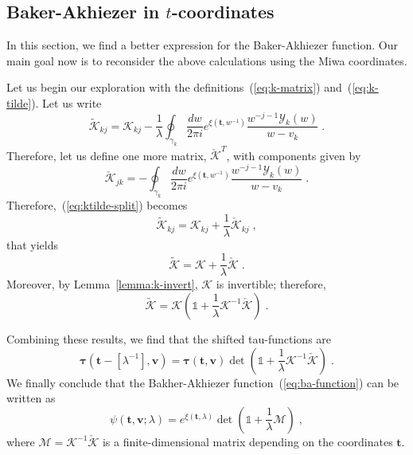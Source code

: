 \documentclass[a4paper,12pt]{amsart}
\begin{document}
\subsection{Baker-Akhiezer in \(t\)-coordinates}

In this section, we find a better expression for the Baker-Akhiezer
function. Our main goal now is to reconsider the above calculations
using the Miwa coordinates.

Let us begin our exploration with the definitions~(\ref{eq:k-matrix})
and~(\ref{eq:k-tilde}). Let us write
\begin{equation}
\label{eq:ktilde-split}
  \widetilde{\mathcal{K}}_{kj} = \mathcal{K}_{kj}
  - \frac{1}{\lambda} \oint_{\gamma_k} \frac{dw}{2\pi i}
    e^{\xi(\bm{t}, w^{- 1})} \frac{w^{-j -1 }\mathcal{Y}_k(w)}{w - v_k} \; .
\end{equation}
Therefore, let us define one more matrix,
\(\check{\bm{\mathcal{K}}}^T\), with components given by
\begin{equation}
  \check{\mathcal{K}}_{jk} =
  - \oint_{\gamma_k} \frac{dw}{2\pi i}
    e^{\xi(\bm{t}, w^{- 1})} \frac{w^{-j -1 }\mathcal{Y}_k(w)}{w - v_k} \; .
\end{equation}
Therefore,~(\ref{eq:ktilde-split}) becomes
\begin{equation}
  \widetilde{\mathcal{K}}_{kj} = 
  \mathcal{K}_{kj}  + \frac{1}{\lambda}
  \check{\mathcal{K}}_{kj} \; , 
\end{equation}
that yields
\begin{equation}
  \widetilde{\bm{\mathcal{K}}} = 
  \bm{\mathcal{K}} + \frac{1}{\lambda}
  \check{\bm{\mathcal{K}}}\; .
\end{equation}
Moreover, by Lemma~\ref{lemma:k-invert}, \(\bm{\mathcal{K}}\) is
invertible; therefore,
\begin{equation}
  \widetilde{\bm{\mathcal{K}}} = 
  \bm{\mathcal{K}}\left( \mathbb{1} + 
  \frac{1}{\lambda}\bm{\mathcal{K}}^{-1}\check{\bm{\mathcal{K}}} \right)\; .
\end{equation}

Combining these results, we find that the shifted tau-functions are
\begin{equation}
  \bm{\tau}(\bm{t} - [\lambda^{-1}], \bm{v}) =
  \bm{\tau}(\bm{t}, \bm{v})
  \det \left( \mathbb{1} + \frac{1}{\lambda}
  \bm{\mathcal{K}}^{-1} \check{\bm{\mathcal{K}}} \right)\; .
\end{equation}
We finally conclude that the Bakher-Akhiezer
function~(\ref{eq:ba-function}) can be written as
\begin{equation}
\label{eq:ba-fredholm}
  \psi(\bm{t},\bm{v}; \lambda) = e^{\xi(\bm{t}, \lambda)}
  \det \left( \mathbb{1} + 
    \frac{1}{\lambda} \bm{\mathcal{M}}
  \right)\; , 
\end{equation}
where \(\bm{\mathcal{M}} =
\bm{\mathcal{K}}^{-1}\check{\bm{\mathcal{K}}}\) is a
finite-dimensional matrix depending on the coordinates
\(\bm{t}\).
\end{document}
